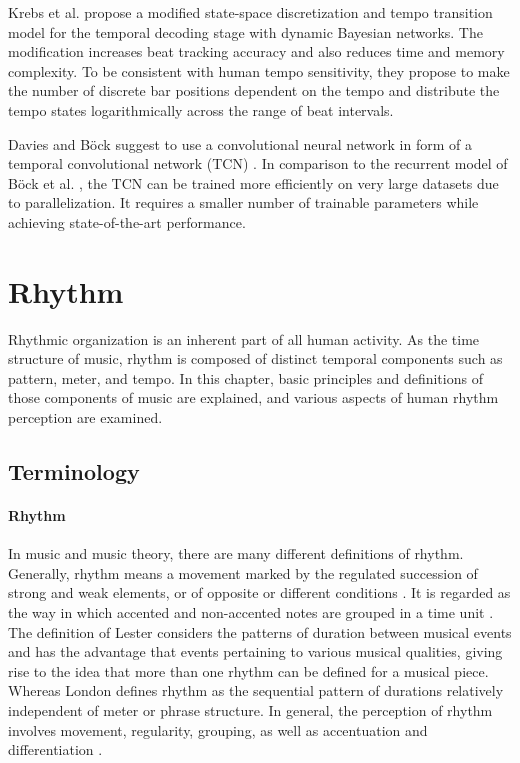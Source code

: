 \documentclass{scrartcl}
\begin{document}
Krebs et al. \cite{Krebs2015} propose a modified state-space discretization and tempo transition model for the temporal decoding stage with dynamic Bayesian networks. The modification increases beat tracking accuracy and also reduces time and memory complexity. To be consistent with human tempo sensitivity, they propose to make the number of discrete bar positions dependent on the tempo and distribute the tempo states logarithmically across the range of beat intervals. 

Davies and Böck \cite{Davies2019} suggest to use a convolutional neural network in form of a temporal convolutional network (TCN) \cite{Bai2018}. In comparison to the recurrent model of Böck et al. \cite{Boeck2014}, the TCN can be trained more efficiently on very large datasets due to parallelization. It requires a smaller number of trainable parameters while achieving state-of-the-art performance. 



\newpage
\section{Rhythm}
\label{sec:rhyhtm}

Rhythmic organization is an inherent part of all human activity. As the time structure of music, rhythm is composed of distinct temporal components such as pattern, meter, and tempo. In this chapter, basic principles and definitions of those components of music are explained, and various aspects of human rhythm perception are examined.  


\subsection{Terminology}

\paragraph{Rhythm} 
In music and music theory, there are many different definitions of rhythm. Generally, rhythm means a movement marked by the regulated succession of strong and weak elements, or of opposite or different conditions \cite{Dictionary1971}. It is regarded as the way in which accented and non-accented notes are grouped in a time unit \cite{Cooper1966}. The definition of Lester \cite{Lester1986} considers the patterns of duration between musical events and has the advantage that events pertaining to various musical qualities, giving rise to the idea that more than one rhythm can be defined for a musical piece. Whereas London \cite{London2001} defines rhythm as the sequential pattern of durations relatively independent of meter or phrase structure. In general, the perception of rhythm involves movement, regularity, grouping, as well as accentuation and differentiation \cite{Handel1989}.
\end{document}
